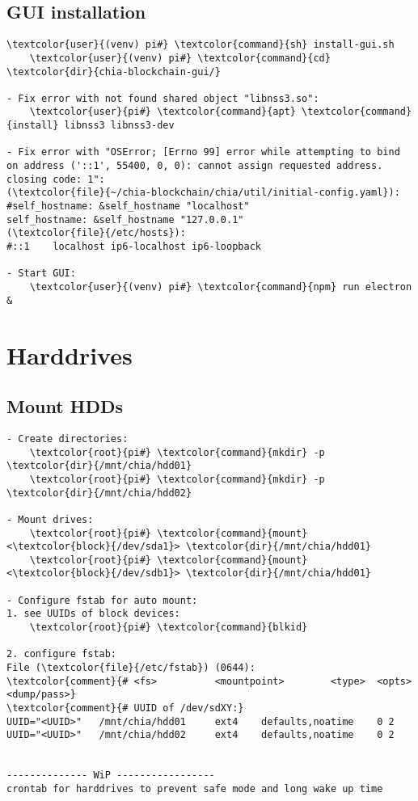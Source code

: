 \documentclass[10pt, a4paper, onecolumn, openany]{book} %
\begin{document}
\subsection{GUI installation}
\begin{Verbatim}[commandchars=\\\{\}]
    \textcolor{user}{(venv) pi#} \textcolor{command}{sh} install-gui.sh
    \textcolor{user}{(venv) pi#} \textcolor{command}{cd} \textcolor{dir}{chia-blockchain-gui/}
    
- Fix error with not found shared object "libnss3.so":
    \textcolor{user}{pi#} \textcolor{command}{apt} \textcolor{command}{install} libnss3 libnss3-dev
    
- Fix error with "OSError; [Errno 99] error while attempting to bind 
on address ('::1', 55400, 0, 0): cannot assign requested address. 
closing code: 1":
(\textcolor{file}{~/chia-blockchain/chia/util/initial-config.yaml}):
#self_hostname: &self_hostname "localhost"
self_hostname: &self_hostname "127.0.0.1"
(\textcolor{file}{/etc/hosts}):
#::1    localhost ip6-localhost ip6-loopback

- Start GUI:    
    \textcolor{user}{(venv) pi#} \textcolor{command}{npm} run electron &
\end{Verbatim}

\section{Harddrives}
\subsection{Mount HDDs}
\begin{Verbatim}[commandchars=\\\{\}]
- Create directories:
    \textcolor{root}{pi#} \textcolor{command}{mkdir} -p \textcolor{dir}{/mnt/chia/hdd01}
    \textcolor{root}{pi#} \textcolor{command}{mkdir} -p \textcolor{dir}{/mnt/chia/hdd02}

- Mount drives:
    \textcolor{root}{pi#} \textcolor{command}{mount} <\textcolor{block}{/dev/sda1}> \textcolor{dir}{/mnt/chia/hdd01}
    \textcolor{root}{pi#} \textcolor{command}{mount} <\textcolor{block}{/dev/sdb1}> \textcolor{dir}{/mnt/chia/hdd01}

- Configure fstab for auto mount:
1. see UUIDs of block devices:
    \textcolor{root}{pi#} \textcolor{command}{blkid}

2. configure fstab:
File (\textcolor{file}{/etc/fstab}) (0644):
\textcolor{comment}{# <fs>          <mountpoint>        <type>  <opts>      <dump/pass>}
\textcolor{comment}{# UUID of /dev/sdXY:}
UUID="<UUID>"   /mnt/chia/hdd01     ext4    defaults,noatime    0 2
UUID="<UUID>"   /mnt/chia/hdd02     ext4    defaults,noatime    0 2


-------------- WiP -----------------
crontab for harddrives to prevent safe mode and long wake up time
\end{Verbatim}
\end{document}
